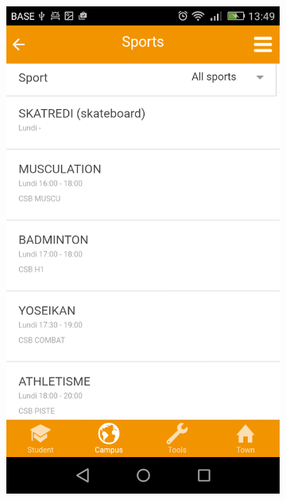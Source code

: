 \documentclass{eplmastersthesis}
\begin{document}
\begin{figure}
\begin{subfigure}[b]{0.3\textwidth}
        \includegraphics[width=\textwidth]{Images/Application_screens/Screenshot_2016-06-06-13-49-46.png}
    \end{subfigure}
    ~ %
    \begin{subfigure}[b]{0.3\textwidth}

\end{subfigure}
\end{figure}
\end{document}
